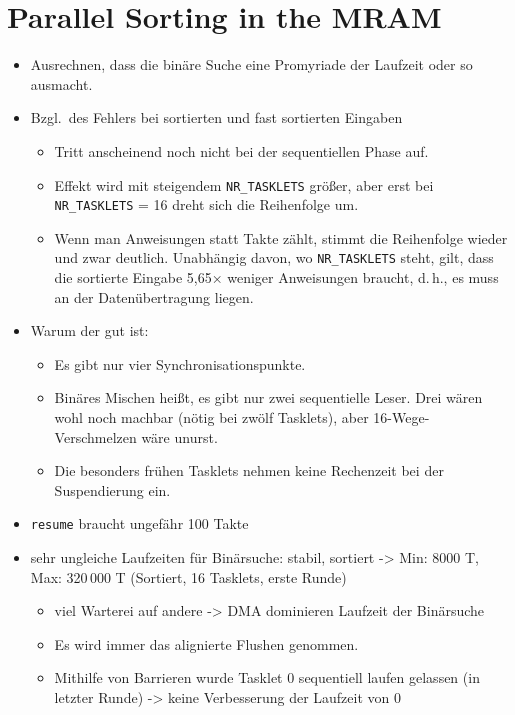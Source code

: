 \chapter{Parallel Sorting in the MRAM}
\label{sec:par}

\begin{itemize}
	\item
	Ausrechnen, dass die binäre Suche eine Promyriade der Laufzeit oder so ausmacht.

	\item
	Bzgl.\ des Fehlers bei sortierten und fast sortierten Eingaben
	\begin{itemize}
		\item
		Tritt anscheinend noch nicht bei der sequentiellen Phase auf.

		\item
		Effekt wird mit steigendem \lstinline|NR_TASKLETS| größer, aber erst bei \lstinline|NR_TASKLETS| = 16 dreht sich die Reihenfolge um.

		\item
		Wenn man Anweisungen statt Takte zählt, stimmt die Reihenfolge wieder und zwar deutlich.
		Unabhängig davon, wo \lstinline|NR_TASKLETS| steht, gilt, dass die sortierte Eingabe 5,65× weniger Anweisungen braucht, d.\,h., es muss an der Datenübertragung liegen.
	\end{itemize}

	\item
	Warum der \MS{} gut ist:
	\begin{itemize}
		\item
		Es gibt nur vier Synchronisationspunkte.

		\item
		Binäres Mischen heißt, es gibt nur zwei sequentielle Leser. Drei wären wohl noch machbar (nötig bei zwölf Tasklets), aber 16-Wege-Verschmelzen wäre unurst.

		\item
		Die besonders frühen Tasklets nehmen keine Rechenzeit bei der Suspendierung ein.
	\end{itemize}

	\item
	\lstinline|resume| braucht ungefähr 100 Takte

	\item
	sehr ungleiche Laufzeiten für Binärsuche:
	stabil, sortiert -> Min: 8000 T, Max: 320\,000 T (Sortiert, 16 Tasklets, erste Runde)
	\begin{itemize}
		\item
		viel Warterei auf andere -> DMA dominieren Laufzeit der Binärsuche

		\item
		Es wird immer das alignierte Flushen genommen.

		\item
		Mithilfe von Barrieren wurde Tasklet 0 sequentiell laufen gelassen (in letzter Runde) -> keine Verbesserung der Laufzeit von 0
	\end{itemize}
\end{itemize}

